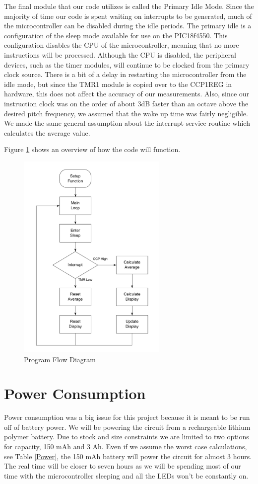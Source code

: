 \documentclass[12pt]{article}
\begin{document}
The final module that our code utilizes is called the Primary Idle Mode. Since the majority of time
our code is spent waiting on interrupts to be generated, much of the microcontroller can be disabled
during the idle periods. The primary idle is a configuration of the sleep mode available for use on
the PIC18f4550. This configuration disables the CPU of the microcontroller, meaning that no more
instructions will be processed. Although the CPU is disabled, the peripheral devices, such as the
timer modules, will continue to be clocked from the primary clock source. There is a bit of a delay
in restarting the microcontroller from the idle mode, but since the TMR1 module is copied over to
the CCP1REG in hardware, this does not affect the accuracy of our measurements. Also, since our
instruction clock was on the order of about 3dB faster than an octave above the desired pitch frequency,
we assumed that the wake up time was fairly negligible. We made the same general assumption about
the interrupt service routine which calculates the average value.

Figure \ref{micro_chart} shows an overview of how the code will function.

\begin{figure}[H]
\centering
	\includegraphics[height=4in]{"MicroChart"}
	\caption{Program Flow Diagram}
	\label{micro_chart} 
\end{figure}


\section{Power Consumption}
Power consumption was a big issue for this project because it is  meant to be run off of battery power. We will be powering the circuit from a rechargeable lithium polymer battery. Due to stock and size constraints we are limited to two options for capacity, 150 mAh and 3 Ah. Even if we assume the worst case calculations, see Table \ref{Power}, the 150 mAh battery will power the circuit for almost 3 hours. The real time will be closer to seven hours as we will be spending most of our time with the microcontroller sleeping and all the LEDs won't be constantly on.
\end{document}
